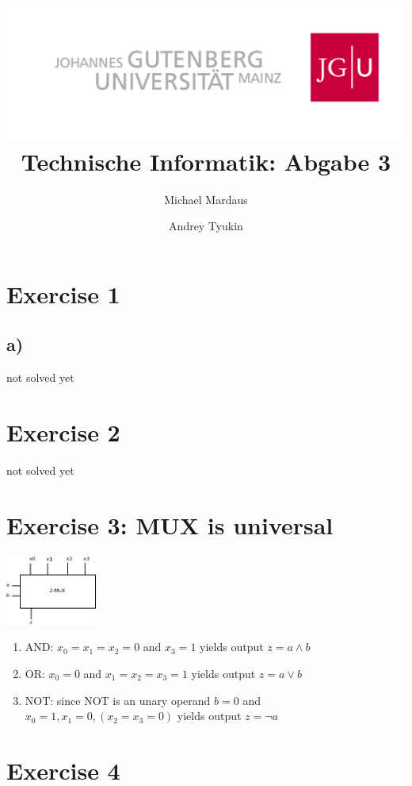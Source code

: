 \documentclass[10pt,a4paper]{scrartcl}
\author{Michael Mardaus \and Andrey Tyukin}
\title{\includegraphics[scale=0.2]{../logo_schriftzug}\\
Technische Informatik: Abgabe 3}
\begin{document}
\maketitle


\section{Exercise 1}
\subsection{a)}
not solved yet

\section{Exercise 2}
not solved yet

\section{Exercise 3: MUX is universal}

\includegraphics[width=3cm]{3-3.png}
\begin{enumerate}
 \item AND: $x_0=x_1=x_2=0$ and $x_3 = 1$ yields output $z = a \land b$
 \item OR: $x_0 = 0$ and $x_1=x_2=x_3= 1$ yields output $z = a \lor b$
 \item NOT: since NOT is an unary operand $b=0$ and $x_0=1, x_1=0, (x_2=x_3=0)$ yields output $z = \lnot a$
\end{enumerate}


\section{Exercise 4}
\end{document}
